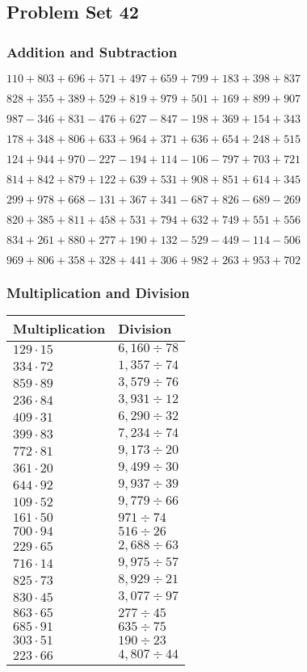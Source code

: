 \hypertarget{problem-set-42-1}{%
\subsection{Problem Set 42}\label{problem-set-42-1}}

\hypertarget{addition-and-subtraction-142}{%
\subsubsection{Addition and
Subtraction}\label{addition-and-subtraction-142}}

\(110 + 803 + 696 + 571 + 497 + 659 + 799 + 183 + 398 + 837\)

\(828 + 355 + 389 + 529 + 819 + 979 + 501 + 169 + 899 + 907\)

\(987 - 346 + 831 - 476 + 627 - 847 - 198 + 369 + 154 + 343\)

\(178 + 348 + 806 + 633 + 964 + 371 + 636 + 654 + 248 + 515\)

\(124 + 944 + 970 - 227 - 194 + 114 - 106 - 797 + 703 + 721\)

\(814 + 842 + 879 + 122 + 639 + 531 + 908 + 851 + 614 + 345\)

\(299 + 978 + 668 - 131 + 367 + 341 - 687 + 826 - 689 - 269\)

\(820 + 385 + 811 + 458 + 531 + 794 + 632 + 749 + 551 + 556\)

\(834 + 261 + 880 + 277 + 190 + 132 - 529 - 449 - 114 - 506\)

\(969 + 806 + 358 + 328 + 441 + 306 + 982 + 263 + 953 + 702\)

\hypertarget{multiplication-and-division-142}{%
\subsubsection{Multiplication and
Division}\label{multiplication-and-division-142}}

\begin{longtable}[]{@{}ll@{}}
\toprule
Multiplication & Division\tabularnewline
\midrule
\endhead
\(129 \cdot 15\) & \(6,160÷78\)\tabularnewline
\(334 \cdot 72\) & \(1,357÷74\)\tabularnewline
\(859 \cdot 89\) & \(3,579÷76\)\tabularnewline
\(236 \cdot 84\) & \(3,931÷12\)\tabularnewline
\(409 \cdot 31\) & \(6,290÷32\)\tabularnewline
\(399 \cdot 83\) & \(7,234÷74\)\tabularnewline
\(772 \cdot 81\) & \(9,173÷20\)\tabularnewline
\(361 \cdot 20\) & \(9,499÷30\)\tabularnewline
\(644 \cdot 92\) & \(9,937÷39\)\tabularnewline
\(109 \cdot 52\) & \(9,779÷66\)\tabularnewline
\(161 \cdot 50\) & \(971÷74\)\tabularnewline
\(700 \cdot 94\) & \(516÷26\)\tabularnewline
\(229 \cdot 65\) & \(2,688÷63\)\tabularnewline
\(716 \cdot 14\) & \(9,975÷57\)\tabularnewline
\(825 \cdot 73\) & \(8,929÷21\)\tabularnewline
\(830 \cdot 45\) & \(3,077÷97\)\tabularnewline
\(863 \cdot 65\) & \(277÷45\)\tabularnewline
\(685 \cdot 91\) & \(635÷75\)\tabularnewline
\(303 \cdot 51\) & \(190÷23\)\tabularnewline
\(223 \cdot 66\) & \(4,807÷44\)\tabularnewline
\bottomrule
\end{longtable}

